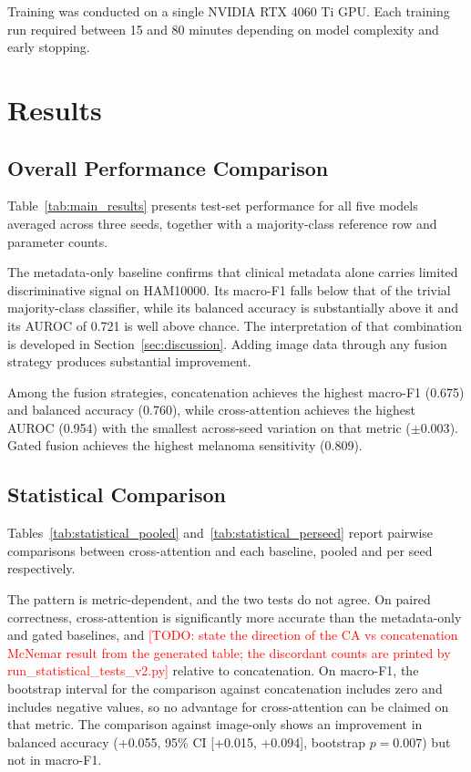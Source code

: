 \documentclass[conference]{IEEEtran}
\newcommand{\TODO}[1]{\textcolor{red}{[TODO: #1]}}
\begin{document}
Training was conducted on a single NVIDIA RTX 4060 Ti GPU. Each training run required between 15 and 80 minutes depending on model complexity and early stopping.

\section{Results}
\label{sec:results}

\subsection{Overall Performance Comparison}

Table~\ref{tab:main_results} presents test-set performance for all five models averaged across three seeds, together with a majority-class reference row and parameter counts.

The metadata-only baseline confirms that clinical metadata alone carries limited discriminative signal on HAM10000. Its macro-F1 falls below that of the trivial majority-class classifier, while its balanced accuracy is substantially above it and its AUROC of 0.721 is well above chance. The interpretation of that combination is developed in Section~\ref{sec:discussion}. Adding image data through any fusion strategy produces substantial improvement.

Among the fusion strategies, concatenation achieves the highest macro-F1 (0.675) and balanced accuracy (0.760), while cross-attention achieves the highest AUROC (0.954) with the smallest across-seed variation on that metric ($\pm 0.003$). Gated fusion achieves the highest melanoma sensitivity (0.809).



\subsection{Statistical Comparison}

Tables~\ref{tab:statistical_pooled} and~\ref{tab:statistical_perseed} report pairwise comparisons between cross-attention and each baseline, pooled and per seed respectively.

The pattern is metric-dependent, and the two tests do not agree. On paired correctness, cross-attention is significantly more accurate than the metadata-only and gated baselines, and \TODO{state the direction of the CA vs concatenation McNemar result from the generated table; the discordant counts are printed by run\_statistical\_tests\_v2.py} relative to concatenation. On macro-F1, the bootstrap interval for the comparison against concatenation includes zero and includes negative values, so no advantage for cross-attention can be claimed on that metric. The comparison against image-only shows an improvement in balanced accuracy (+0.055, 95\% CI [+0.015, +0.094], bootstrap $p = 0.007$) but not in macro-F1.
\end{document}
